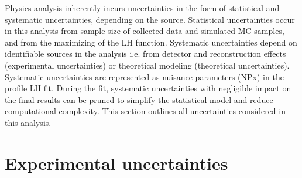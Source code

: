 \documentclass[../thesis.tex]{subfiles}
\begin{document}
\vspace{-1\baselineskip}
Physics analysis inherently incurs uncertainties in the form of statistical and systematic uncertainties, depending on the source. Statistical uncertainties occur in this analysis from sample size of collected data and simulated \acs{MC} samples, and from the maximizing of the \acs{LH} function. Systematic uncertainties depend on identifiable sources in the analysis i.e. from detector and reconstruction effects (experimental uncertainties) or theoretical modeling (theoretical uncertainties). Systematic uncertainties are represented as nuisance parameters (\acs{NP}x) in the profile \acs{LH} fit. During the fit, systematic uncertainties with negligible impact on the final results can be pruned to simplify the statistical model and reduce computational complexity. This section outlines all uncertainties considered in this analysis.

\section{Experimental uncertainties}
\label{sec:sysexp}
\end{document}
